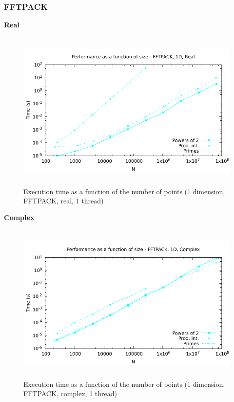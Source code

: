 \documentclass[12pt, a4paper]{article}
\begin{document}
\subsubsection{FFTPACK}
{\bf Real}
\begin{figure}[H]
\captionsetup{width=0.6\textwidth}
\centering
\includegraphics[height=8cm]{graphs/performance/1d-fftpack-r.pdf}
\caption{Execution time as a function of the number of points (1 dimension, FFTPACK, real, 1 thread)}
\label{1DFFTPACK}
\end{figure}
{\bf Complex}
\begin{figure}[H]
\captionsetup{width=0.6\textwidth}
\centering
\includegraphics[height=8cm]{graphs/performance/1d-fftpack-c.pdf}
\caption{Execution time as a function of the number of points (1 dimension, FFTPACK, complex, 1 thread)}
\label{1DFFTPACKC}
\end{figure}
\end{document}

